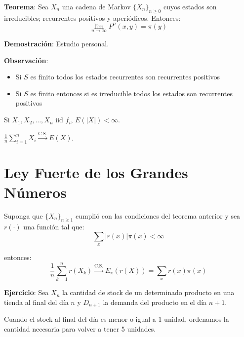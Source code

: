 \documentclass[12pt,a4paper]{article}
\newcommand{\teorema}[1]{%
\begin{teoremabox}
\textbf{Teorema}: #1
\end{teoremabox}
}
\begin{document}
\teorema{Sea $X_n$ una cadena de Markov $\{X_n\}_{n \geq 0}$ cuyos estados son irreducibles; recurrentes positivos y aperiódicos. Entonces:
\begin{equation*}
\lim_{n \to \infty} P^n(x,y) = \pi(y)
\end{equation*}}

\textbf{Demostración}: Estudio personal.

\textbf{Observación}:

\begin{itemize}
    \item Si $S$ es finito todos los estados recurrentes son recurrentes positivos
    \item Si $S$ es finito entonces si es irreducible todos los estados son recurrentes positivos
\end{itemize}

\begin{mdframed}[
    backgroundcolor=blue!10,
    linecolor=blue,
    linewidth=1pt,
    roundcorner=5pt,
    innertopmargin=10pt,
    innerbottommargin=10pt,
    innerleftmargin=10pt,
    innerrightmargin=10pt
]

Si $X_1, X_2, \dots, X_n$ iid $f_i$, $E(|X|) < \infty$.

$\frac{1}{n} \sum_{i=1}^{n} X_i \xrightarrow{\text{C.S.}} E(X)$.

\end{mdframed}

\section*{Ley Fuerte de los Grandes Números}

Suponga que $\{X_n\}_{n \geq 1}$ cumplió con las condiciones del teorema anterior y sea $r(\cdot)$ una función tal que:
\begin{equation}
\sum_{x} |r(x)| \pi(x) < \infty
\end{equation}

entonces:
\begin{equation}
\frac{1}{n} \sum_{k=1}^{n} r(X_k) \xrightarrow{\text{C.S.}} E_{\pi}(r(X)) = \sum_{x} r(x) \pi(x)
\end{equation}

\textbf{Ejercicio}: Sea $X_n$ la cantidad de stock de un determinado producto en una tienda al final del día $n$ y $D_{n+1}$ la demanda del producto en el día $n+1$.

Cuando el stock al final del día es menor o igual a 1 unidad, ordenamos la cantidad necesaria para volver a tener 5 unidades.
\end{document}
